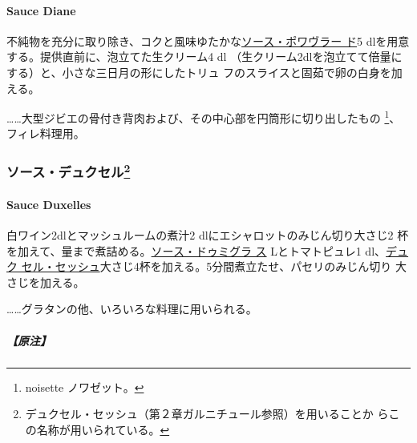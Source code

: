 \begin{recette}
\hypertarget{sauce-diane}{%
\paragraph{Sauce Diane}\label{sauce-diane}}

  

不純物を充分に取り除き、コクと風味ゆたかな\protect\hyperlink{sauce-poivrade}{ソース・ポワヴラー
ド}5 dlを用意する。提供直前に、泡立てた生クリーム4 dl
（生クリーム2dlを泡立てて倍量にする）と、小さな三日月の形にしたトリュ
フのスライスと固茹で卵の白身を加える。

\ldots{}\ldots{}大型ジビエの骨付き背肉および、その中心部を円筒形に切り出したもの
\footnote{noisette ノワゼット。}、フィレ料理用。

\maeaki

\hypertarget{ux30bdux30fcux30b9ux30c7ux30e5ux30afux30bbux30eb29}{%
\subsubsection[ソース・デュクセル]{\texorpdfstring{ソース・デュクセル\footnote{デュクセル・セッシュ（第２章ガルニチュール参照）を用いることか
  らこの名称が用いられている。}}{ソース・デュクセル}}\label{ux30bdux30fcux30b9ux30c7ux30e5ux30afux30bbux30eb29}}

\hypertarget{sauce-duxelles}{%
\paragraph{Sauce Duxelles}\label{sauce-duxelles}}

  

白ワイン2dlとマッシュルームの煮汁2 dlにエシャロットのみじん切り大さじ2
杯を加えて、\untiers{}量まで煮詰める。\protect\hyperlink{sauce-demi-glace}{ソース・ドゥミグラ
ス}\undemi{} Lとトマトピュレ1\undemi{} dl、\protect\hyperlink{}{デュク
セル・セッシュ}大さじ4杯を加える。5分間煮立たせ、パセリのみじん切り
大さじ\undemi{}を加える。

\ldots{}\ldots{}グラタンの他、いろいろな料理に用いられる。

\hypertarget{ux539fux6ce8-1}{%
\subparagraph{【原注】}\label{ux539fux6ce8-1}}


\end{recette}

